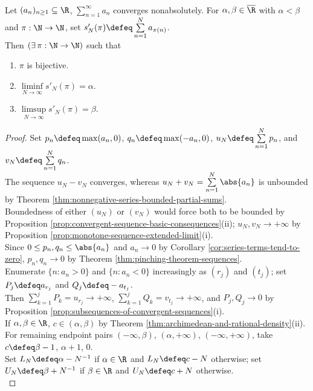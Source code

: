 \begin{theorem} \label{thm:riemann-rearrangement-theorem} \\
Let $(a_n)_{n\geq1}\subseteq\R$, $\sum\limits_{n=1}^{\infty}a_n$ converges nonabsolutely. For $\alpha,\beta\in\overline{\R}$ with $\alpha<\beta$ and $\pi:\N\to\N$, set $s'_N(\pi)\defeq\sum\limits_{n=1}^{N}a_{\pi(n)}$.\\
Then $(\exists\,\pi:\N\to\N)$ such that
\begin{enumerate}[label=(\roman*)]
\setlength{\itemsep}{0pt}
\item $\pi$ is bijective.
\item $\liminf\limits_{N\to\infty}s'_N(\pi)=\alpha$.
\item $\limsup\limits_{N\to\infty}s'_N(\pi)=\beta$.
\end{enumerate}
\begin{proof}
Set $p_n\defeq\max(a_n,0)$, $q_n\defeq\max(-a_n,0)$, $u_N\defeq\sum\limits_{n=1}^{N}p_n$, and $v_N\defeq\sum\limits_{n=1}^{N}q_n$.\\
The sequence $u_N-v_N$ converges, whereas $u_N+v_N=\sum\limits_{n=1}^{N}\abs{a_n}$ is unbounded by Theorem \ref{thm:nonnegative-series-bounded-partial-sums}.\\
Boundedness of either $(u_N)$ or $(v_N)$ would force both to be bounded by Proposition \ref{prop:convergent-sequence-basic-consequences}(ii); $u_N,v_N\to+\infty$ by Proposition \ref{prop:monotone-sequence-extended-limit}(i).\\
Since $0\leq p_n,q_n\leq\abs{a_n}$ and $a_n\to0$ by Corollary \ref{cor:series-terms-tend-to-zero}, $p_n,q_n\to0$ by Theorem \ref{thm:pinching-theorem-sequences}.\\
Enumerate $\{n:a_n>0\}$ and $\{n:a_n<0\}$ increasingly as $(r_j)$ and $(t_j)$; set $P_j\defeq a_{r_j}$ and $Q_j\defeq-a_{t_j}$.\\
Then $\sum\limits_{k=1}^{j}P_k=u_{r_j}\to+\infty$, $\sum\limits_{k=1}^{j}Q_k=v_{t_j}\to+\infty$, and $P_j,Q_j\to0$ by Proposition \ref{prop:subsequences-of-convergent-sequences}(i).\\
If $\alpha,\beta\in\R$, $c\in(\alpha,\beta)$ by Theorem \ref{thm:archimedean-and-rational-density}(ii). For remaining endpoint pairs $(-\infty,\beta)$, $(\alpha,+\infty)$, $(-\infty,+\infty)$, take $c\defeq\beta-1$, $\alpha+1$, $0$.\\
Set $L_N\defeq\alpha-N^{-1}$ if $\alpha\in\R$ and $L_N\defeq c-N$ otherwise; set $U_N\defeq\beta+N^{-1}$ if $\beta\in\R$ and $U_N\defeq c+N$ otherwise.\\

\end{proof}
\end{theorem}
